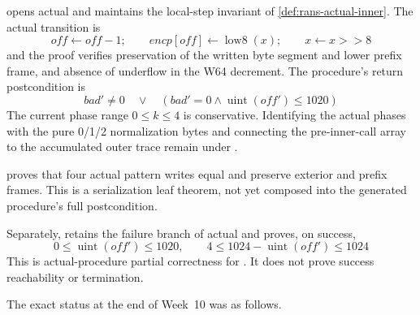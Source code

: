 \begin{verified}
\label{thm:rans-actual-inner}
 opens actual
 and maintains the local-step
invariant of \cref{def:rans-actual-inner}. The actual transition is
\[
  off\gets off-1;\qquad encp[off]\gets\operatorname{low8}(x);
  \qquad x\gets x\mathbin{\mathtt{>>}}8
\]
and the proof verifies preservation of the written byte segment and lower
prefix frame, and absence of underflow in the W64 decrement. The procedure's
return postcondition is
\[
  bad'\ne0\quad\lor\quad(bad'=0\land\operatorname{uint}(off')\le1020)
\]
The current phase range \(0\le k\le4\) is conservative. Identifying the actual
phases with the pure 0/1/2 normalization bytes and connecting the pre-inner-call
array to the accumulated outer trace remain \statuspartial{} under
.
\end{verified}

\begin{verified}
\label{thm:rans-encoder-success-size}
\leavevmode\par
{} proves that four actual pattern
 writes equal  and preserve
exterior and prefix frames. This is a serialization leaf theorem, not yet
composed into the generated procedure's full postcondition.

Separately,  retains the
failure branch of actual  and proves, on success,
\[
  0\le\operatorname{uint}(off')\le1020,\qquad
  4\le1024-\operatorname{uint}(off')\le1024
\]
This is actual-procedure partial correctness for
. It does not prove success reachability
or termination.
\end{verified}

The exact status at the end of Week~10 was as follows.

